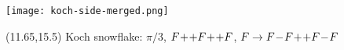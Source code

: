 \documentclass[final]{beamer}
\newcommand{\nt}{\negthinspace}
\newcommand{\m}{\nt-\nt}
\newcommand{\p}{\nt+\nt}
\begin{document}
\begin{frame}{}
\texttt{[image: koch-side-merged.png]}
\begin{textblock}{20}(11.65,15.5)
Koch snowflake: $\pi/3$, $F\p+ F\p+ F$, $F\to F\m F\p+ F\m F$
\end{textblock}
\end{frame}
\end{document}
